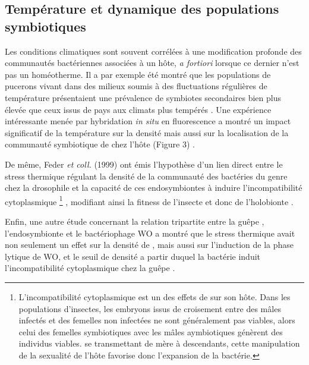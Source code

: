 \subsection{Température et dynamique des populations symbiotiques}

Les conditions climatiques sont souvent corrélées à une modification profonde des communautés bactériennes associées à un hôte, \textit{a fortiori} lorsque ce dernier n'est pas un homéotherme.
Il a par exemple été montré que les populations de pucerons vivant dans des milieux soumis à des fluctuations régulières de température présentaient une prévalence de symbiotes secondaires bien plus élevée que ceux issus de pays aux climats plus tempérés \cite{harmon2009}.
Une expérience intéressante menée par hybridation \textit{in situ} en fluorescence a montré un impact significatif de la température sur la densité mais aussi sur la localisation de la communauté symbiotique de  chez l'hôte  (Figure 3) \cite{brumin2011}.

De même, Feder \textit{et coll.} (1999) ont émis l'hypothèse d'un lien direct entre le stress thermique régulant la densité de la communauté des bactéries du genre  chez la drosophile et la capacité de ces endosymbiontes à induire l'incompatibilité cytoplasmique%
\footnote{L'incompatibilité cytoplasmique est un des effets de  sur son hôte. Dans les populations d'insectes, les embryons issus de croisement entre des mâles infectés et des femelles non infectées ne sont généralement pas viables, alors celui des femelles symbiotiques avec les mâles aymbiotiques génèrent des individus viables.  se transmettant de mère à descendants, cette manipulation de la sexualité de l'hôte favorise donc l'expansion de la bactérie.}%
, modifiant ainsi la fitness de l'insecte et donc de l'holobionte \cite{feder1999}. 

Enfin, une autre étude concernant la relation tripartite entre la guêpe , l'endosymbionte  et le bactériophage WO a montré que le stress thermique avait non seulement un effet sur la densité de , mais aussi sur l'induction de la phase lytique de WO, et le seuil de densité a partir duquel la bactérie  induit l'incompatibilité cytoplasmique chez la guêpe \cite{bordenstein2011}.

